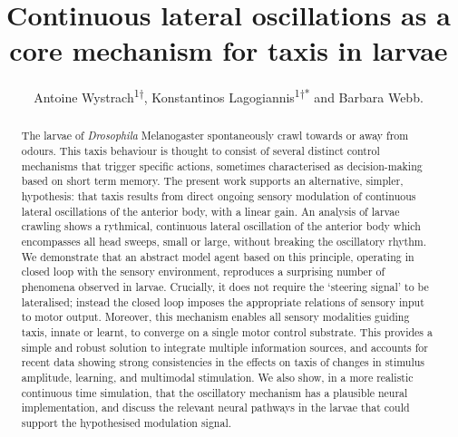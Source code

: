 \documentclass[10pt,a4paper]{article}
\author{Antoine Wystrach\textsuperscript{1†}, Konstantinos Lagogiannis\textsuperscript{1†*} and Barbara Webb.}
\title{Continuous lateral oscillations as a core mechanism for taxis in \Dros larvae}
\newcommand{\Dros }{\emph{Drosophila }}
\begin{document}



\maketitle
\begin{abstract}
The larvae of \Dros  Melanogaster spontaneously crawl towards or away from odours. This taxis behaviour is thought to consist of several distinct control mechanisms that trigger specific actions, sometimes characterised as decision-making based on short term memory. The present work supports an alternative, simpler, hypothesis: that taxis results from direct ongoing sensory modulation of continuous lateral oscillations of the anterior body, with a linear gain. An analysis of larvae crawling shows a rythmical, continuous lateral oscillation of the anterior body which encompasses all head sweeps, small or large, without breaking the oscillatory rhythm. We demonstrate that an abstract model agent based on this principle, operating in closed loop with the sensory environment, reproduces a surprising number of phenomena observed in larvae. Crucially, it does not require the `steering signal' to be lateralised; instead the closed loop imposes the appropriate relations of sensory input to motor output. Moreover, this mechanism enables all sensory modalities guiding taxis, innate or learnt, to converge on a single motor control substrate. This provides a simple and robust solution to integrate multiple information sources, and accounts for recent data showing strong consistencies in the effects on taxis of changes in stimulus amplitude, learning, and multimodal stimulation. We also show, in a more realistic continuous time simulation, that the oscillatory mechanism has a plausible neural implementation, and discuss the relevant neural pathways in the larvae that could support the hypothesised modulation signal.
\end{abstract}

\end{document}
